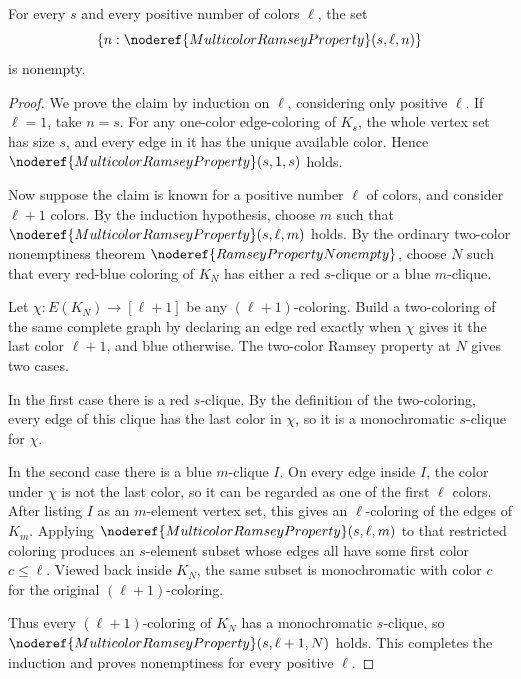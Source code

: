 \begin{helper}
For every \(s\) and every positive number of colors \(\ell\), the set
\[
  \{n:\noderef{MulticolorRamseyProperty}(s,\ell,n)\}
\]
is nonempty.
\end{helper}
\begin{proof}
We prove the claim by induction on \(\ell\), considering only positive
\(\ell\).  If \(\ell=1\), take \(n=s\).  For any one-color edge-coloring of
\(K_s\), the whole vertex set has size \(s\), and every edge in it has the
unique available color.  Hence
\(\noderef{MulticolorRamseyProperty}(s,1,s)\) holds.

Now suppose the claim is known for a positive number \(\ell\) of colors, and
consider \(\ell+1\) colors.  By the induction hypothesis, choose \(m\) such
that \(\noderef{MulticolorRamseyProperty}(s,\ell,m)\) holds.  By the ordinary
two-color nonemptiness theorem \(\noderef{RamseyPropertyNonempty}\), choose
\(N\) such that every red-blue coloring of \(K_N\) has either a red
\(s\)-clique or a blue \(m\)-clique.

Let \(\chi:E(K_N)\to[\ell+1]\) be any \((\ell+1)\)-coloring.  Build a
two-coloring of the same complete graph by declaring an edge red exactly when
\(\chi\) gives it the last color \(\ell+1\), and blue otherwise.  The
two-color Ramsey property at \(N\) gives two cases.

In the first case there is a red \(s\)-clique.  By the definition of the
two-coloring, every edge of this clique has the last color in \(\chi\), so it
is a monochromatic \(s\)-clique for \(\chi\).

In the second case there is a blue \(m\)-clique \(I\).  On every edge inside
\(I\), the color under \(\chi\) is not the last color, so it can be regarded as
one of the first \(\ell\) colors.  After listing \(I\) as an \(m\)-element
vertex set, this gives an \(\ell\)-coloring of the edges of \(K_m\).  Applying
\(\noderef{MulticolorRamseyProperty}(s,\ell,m)\) to that restricted coloring
produces an \(s\)-element subset whose edges all have some first color
\(c\le\ell\).  Viewed back inside \(K_N\), the same subset is monochromatic
with color \(c\) for the original \((\ell+1)\)-coloring.

Thus every \((\ell+1)\)-coloring of \(K_N\) has a monochromatic \(s\)-clique,
so \(\noderef{MulticolorRamseyProperty}(s,\ell+1,N)\) holds.  This completes
the induction and proves nonemptiness for every positive \(\ell\).
\end{proof}

